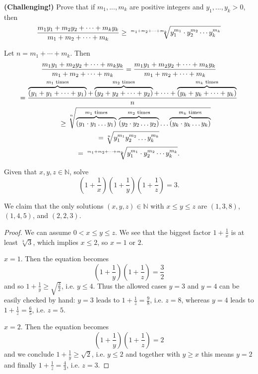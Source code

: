 \documentclass[11pt,dvipsnames]{book}
\numberwithin{equation}{section} %
\numberwithin{figure}{section} %
\numberwithin{table}{section} %
\begin{document}
\begin{exercise} {\bf(Challenging!)} Prove that if $m_{1},...,m_{k}$ are positive integers and $y_{1},...,y_{k}>0$, then
\[
{m_1y_1+m_2y_2+\cdots+m_ky_k \over m_1+m_2+\cdots+m_k} \geq \sqrt[\large m_1+m_2+\cdots+m_k]{y_1^{m_1}\cdot y_2^{m_2}\cdots y_k^{m_k}}
\]

\begin{solution}
Let $n=m_{1}+\cdots + m_{k}$. Then 
\begin{multline*}
{m_1y_1+m_2y_2+\cdots+m_ky_k \over m_1+m_2+\cdots+m_k} 
= 
{m_1y_1+m_2y_2+\cdots+m_ky_k \over m_1+m_2+\cdots+m_k} \\
= 
\frac{\overbrace{(y_1+y_1+\dots+y_1)}^{m_1 \text{ times}}+\overbrace{(y_2+y_2+\dots+y_2)}^{m_2 \text{ times}}+\dots+\overbrace{(y_k+y_k+\dots+y_k)}^{m_k \text{ times}}}n \\
\qquad \geq  \sqrt[n]{\overbrace{(y_1 \cdot y_1 \dots y_1)}^{m_1 \text{ times}}\, \overbrace{(y_2 \cdot y_2 \dots y_2)}^{m_2 \text{ times}} \dots \overbrace{(y_k \cdot y_k \dots y_k)}^{m_k \text{ times}}}\\
=  \sqrt[n]{y_1^{m_1} y_2^{m_2} \dots y_k^{m_k}}\\
= \sqrt[\large m_1+m_2+\cdots+m_k]{y_1^{m_1}\cdot y_2^{m_2}\cdots y_k^{m_k}}.
\end{multline*}
\end{solution}
\end{exercise}


\begin{exercise} Given that $x,y,z\in\mathbb{N}$, solve
\[
\left(1+\frac{1}{x}\right)\left(1+\frac{1}{y}\right)\left(1+\frac{1}{z}\right)=3.
\]
\begin{solution}
We claim that the only solutions $(x,y,z)\in \mathbb N$ with $x\le y\le z$ are $(1,3,8)$, $(1,4,5)$, and $(2,2,3)$.

\begin{proof}
We can assume $0< x\leq y\leq z$. We see that the biggest factor $1+\frac1x$ is at least $\sqrt[3]3$, which implies $x\leq 2$, so $x=1$ or $2$.

 $x=1$. Then the equation becomes
$$\left(1+\frac1y\right)\left(1+\frac1z\right)=\frac32$$
and so $1+\frac1y\geq\sqrt{\frac32}$, i.e. $y\leq 4$.
Thus the allowed cases $y=3$ and $y=4$ can be easily checked by hand: $y=3$ leads to $1+\frac1z = \frac98$, i.e. $z=8$, whereas $y=4$ leads to $1+\frac1z = \frac{6}{5}$, i.e. $z=5$.

 $x=2$. Then the equation becomes
$$\left(1+\frac1y\right)\left(1+\frac1z\right)=2$$ and we conclude $1+\frac1y\ge\sqrt{2}$, i.e. $y\leq 2$ and together with $y\geq x$ this means $y=2$ and finally $1+\frac1z=\frac43$, i.e. $z=3$.
\end{proof}
\end{solution}
\end{exercise}
\end{document}
